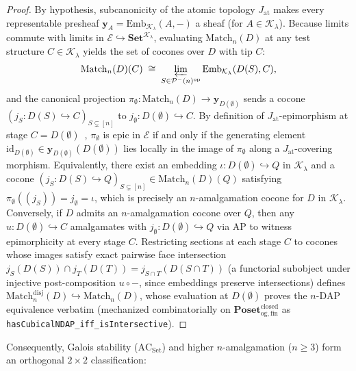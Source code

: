 \documentclass[10pt,twoside,openright]{book}
\theoremstyle{crmplain}
\theoremstyle{crmdef}
\theoremstyle{crmremark}
\begin{document}
\begin{proof}
By hypothesis, subcanonicity of the atomic topology $J_{\mathrm{at}}$ makes every representable presheaf $\mathbf{y}_A = \mathrm{Emb}_{\mathcal{K}_\lambda}(A, -)$ a sheaf (for $A \in \mathcal{K}_\lambda$). Because limits commute with limits in $\mathcal{E} \hookrightarrow \mathbf{Set}^{\mathcal{K}_\lambda}$, evaluating $\mathrm{Match}_n(D)$ at any test structure $C \in \mathcal{K}_\lambda$ yields the set of cocones over $D$ with tip $C$:
\[
  \mathrm{Match}_n(D)(C) \;\cong\; \varprojlim_{S \in \mathcal{P}^-(n)^{\mathrm{op}}} \mathrm{Emb}_{\mathcal{K}_\lambda}(D(S), C),
\]
and the canonical projection $\pi_\emptyset : \mathrm{Match}_n(D) \to \mathbf{y}_{D(\emptyset)}$ sends a cocone $(j_S : D(S) \hookrightarrow C)_{S \subsetneq [n]}$ to $j_\emptyset : D(\emptyset) \hookrightarrow C$. By definition of $J_{\mathrm{at}}$-epimorphism at stage $C = D(\emptyset)$~\cite[\S C2.2]{Johnstone02}, $\pi_\emptyset$ is epic in $\mathcal{E}$ if and only if the generating element $\mathrm{id}_{D(\emptyset)} \in \mathbf{y}_{D(\emptyset)}(D(\emptyset))$ lies locally in the image of $\pi_\emptyset$ along a $J_{\mathrm{at}}$-covering morphism. Equivalently, there exist an embedding $\iota : D(\emptyset) \hookrightarrow Q$ in $\mathcal{K}_\lambda$ and a cocone $(j_S : D(S) \hookrightarrow Q)_{S \subsetneq [n]} \in \mathrm{Match}_n(D)(Q)$ satisfying $\pi_\emptyset((j_S)) = j_\emptyset = \iota$, which is precisely an $n$-amalgamation cocone for $D$ in $\mathcal{K}_\lambda$. Conversely, if $D$ admits an $n$-amalgamation cocone over $Q$, then any $u : D(\emptyset) \hookrightarrow C$ amalgamates with $j_\emptyset : D(\emptyset) \hookrightarrow Q$ via $\mathrm{AP}$ to witness epimorphicity at every stage $C$. Restricting sections at each stage $C$ to cocones whose images satisfy exact pairwise face intersection $j_S(D(S)) \cap j_T(D(T)) = j_{S \cap T}(D(S \cap T))$ (a functorial subobject under injective post-composition $u \circ -$, since embeddings preserve intersections) defines $\mathrm{Match}_n^{\mathrm{disj}}(D) \hookrightarrow \mathrm{Match}_n(D)$, whose evaluation at $D(\emptyset)$ proves the $n$-$\mathrm{DAP}$ equivalence verbatim (mechanized combinatorially on $\mathbf{Poset}_{\mathrm{og,fin}}^{\mathrm{closed}}$ as \texttt{hasCubicalNDAP\_\allowbreak iff\_\allowbreak isIntersective}).
\end{proof}

Consequently, Galois stability ($\mathrm{AC}_{\mathrm{Set}}$) and higher $n$-amalgamation ($n \ge 3$) form an orthogonal $2 \times 2$ classification:
\end{document}
